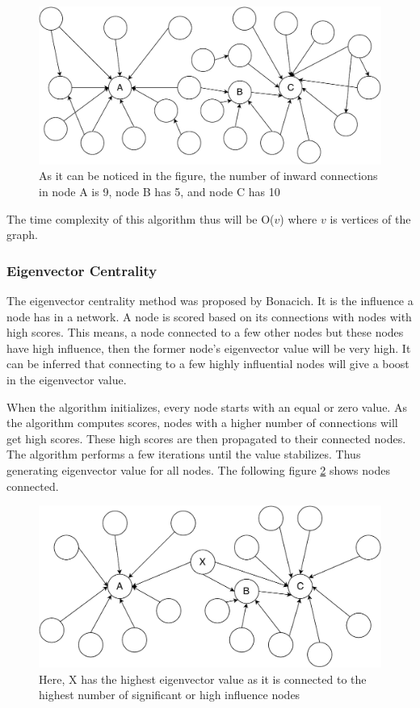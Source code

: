 \documentclass[journal,twoside,web]{ieeecolor}
\begin{document}
\begin{figure}[!h]
    \centerline{\includegraphics[scale=0.45]{figures/degree_centrality.pdf}}
    \caption{As it can be noticed in the figure, the number of inward connections in node A is 9, node B has 5, and node C has 10}
    \label{fig7}
\end{figure}

The time complexity of this algorithm thus will be O($v$) where $v$ is vertices of the graph.

\subsubsection{Eigenvector Centrality}
The eigenvector centrality method was proposed by Bonacich\cite{26}. It is the influence a node has in a network. A node is scored based on its connections with nodes with high scores. This means, a node connected to a few other nodes but these nodes have high influence, then the former node's eigenvector value will be very high. It can be inferred that connecting to a few highly influential nodes will give a boost in the eigenvector value.

When the algorithm initializes, every node starts with an equal or zero value. As the algorithm computes scores, nodes with a higher number of connections will get high scores. These high scores are then propagated to their connected nodes. The algorithm performs a few iterations until the value stabilizes. Thus generating eigenvector value for all nodes. The following figure \ref{fig8} shows nodes connected.

\begin{figure}[!h]
    \centerline{\includegraphics[scale=0.45]{figures/eigenvector_centrality.pdf}}
    \caption{Here, X has the highest eigenvector value as it is connected to the highest number of significant or high influence nodes}
    \label{fig8}
\end{figure}
\end{document}
